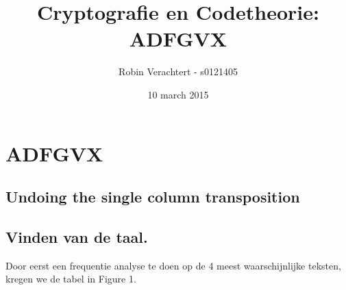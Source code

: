 \documentclass[a4paper,11pt]{article}
\author{Robin Verachtert - s0121405}
\title{Cryptografie en Codetheorie: \\ADFGVX}
\date{10 march 2015}
\begin{document}
\maketitle 
\tableofcontents
\pagebreak
\section{ADFGVX}
\subsection{Undoing the single column transposition}

\subsection{Vinden van de taal.}
Door eerst een frequentie analyse te doen op de 4 meest waarschijnlijke teksten, kregen we de tabel in Figure 1.
\end{document}

